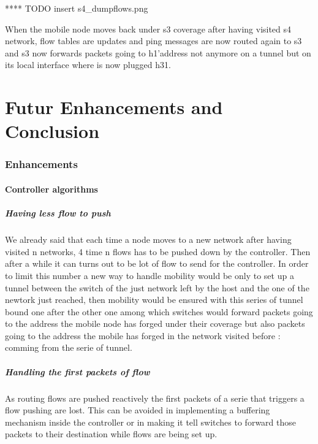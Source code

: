 \documentclass{article}
\begin{document}
**** TODO insert s4_dumpflows.png

When the mobile node moves back under s3 coverage after having
visited s4 network, flow tables are updates and ping messages are now
routed again to s3 and s3 now forwards packets going to h1'address
not anymore on a tunnel but on its local interface where is now
plugged h31.


\part{Futur Enhancements and Conclusion}

\section{Enhancements}

\subsection{Controller algorithms}

\subsubsection{Having less flow to push}
We already said that each time a node moves to a new network after
having visited n networks, 4 time n flows has to be pushed down by the
controller. Then after a while it can turns out to be lot of flow to
send for the controller. In order to limit this number a new way to
handle mobility would be only to set up a tunnel between the switch
of the just network left by the host and the one of the newtork just
reached, then mobility would be ensured with this series of tunnel
bound one after the other one among which switches would forward
packets going to the address the mobile node has forged under their
coverage but also packets going to the address the mobile has forged in
the network visited before : comming from the serie of tunnel. 

\subsubsection{Handling the first packets of flow}
As routing flows are pushed reactively the first packets of a serie
that triggers a flow pushing are lost. This can be avoided in
implementing a buffering mechanism inside the controller or in making
it tell switches to forward those packets to their destination
while flows are being set up.
\end{document}
